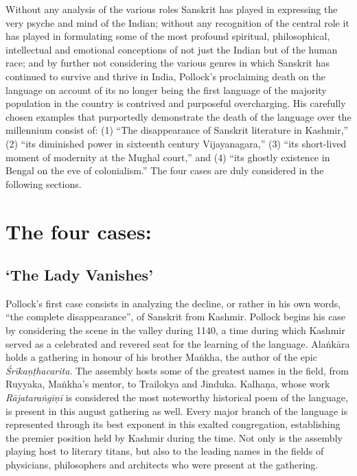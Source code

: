 Without any analysis of the various roles Sanskrit has played in expressing the very psyche and mind of the Indian; without any recognition of the central role it has played in formulating some of the most profound spiritual, philosophical, intellectual and emotional conceptions of not just the Indian but of the human race; and by further not considering the various genres in which Sanskrit has continued to survive and thrive in India, Pollock’s proclaiming death on the language on account of its no longer being the first language of the majority population in the country is contrived and purposeful overcharging. His carefully chosen examples that purportedly demonstrate the death of the language over the millennium consist of: (1) “The disappearance of Sanskrit literature in Kashmir,” (2) “its diminished power in sixteenth century Vijayanagara,” (3) “its short-lived moment of modernity at the Mughal court,” and (4) “its ghostly existence in Bengal on the eve of colonialism.” The four cases are duly considered in the following sections.

\section*{The four cases:}

\makeatletter
\renewcommand\thesubsection{\@arabic\c@subsection}
\makeatother
\subsection{‘The Lady Vanishes’}

Pollock’s first case consists in analyzing the decline, or rather in his own words, “the complete disappearance”, of Sanskrit from Kashmir. Pollock begins his case by considering the scene in the valley during 1140, a time during which Kashmir served as a celebrated and revered seat for the learning of the language. Alaṅkāra holds a gathering in honour of his brother Maṅkha, the author of the epic {\sl Śrīkaṇṭhacarita}. The assembly hosts some of the greatest names in the field, from Ruyyaka, Maṅkha’s mentor, to Trailokya and Jinduka. Kalhaṇa, whose work {\sl Rājataraṅgiṇī} is considered the most noteworthy historical poem of the language, is present in this august gathering as well. Every major branch of the language is represented through its best exponent in this exalted congregation, establishing the premier position held by Kashmir during the time. Not only is the assembly playing host to literary titans, but also to the leading names in the fields of physicians, philosophers and architects who were present at the gathering.

